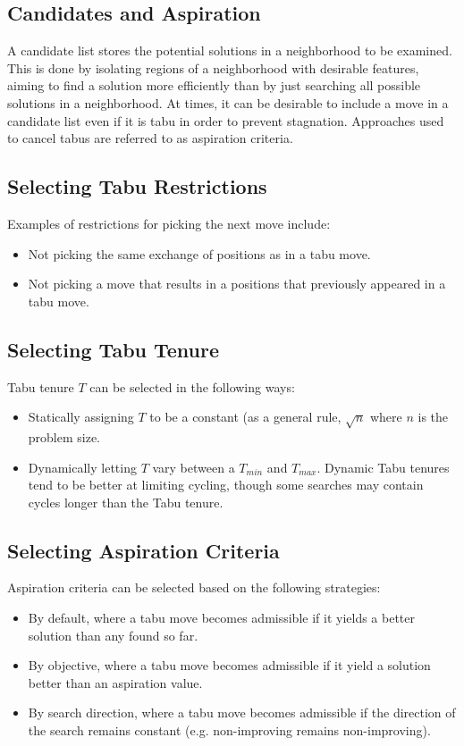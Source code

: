 \documentclass[12pt,titlepage]{article}
\begin{document}
    \subsection{Candidates and Aspiration}
      A candidate list stores the potential solutions in a neighborhood to be examined. This is done by isolating regions of a neighborhood with desirable features, aiming
      to find a solution more efficiently than by just searching all possible solutions in a neighborhood. At times, it can be desirable to include a move in a candidate list
      even if it is tabu in order to prevent stagnation. Approaches used to cancel tabus are referred to as aspiration criteria. 

    \subsection{Selecting Tabu Restrictions}
      Examples of restrictions for picking the next move include:
      \begin{itemize}
        \item Not picking the same exchange of positions as in a tabu move.
        \item Not picking a move that results in a positions that previously appeared in a tabu move.
      \end{itemize}

    \subsection{Selecting Tabu Tenure}
      Tabu tenure $T$ can be selected in the following ways:
      \begin{itemize}
        \item Statically assigning $T$ to be a constant (as a general rule, $\sqrt{n}$ where $n$ is the problem size.
        \item Dynamically letting $T$ vary between a $T_{min}$ and $T_{max}$. Dynamic Tabu tenures tend to be better at limiting cycling,
        though some searches may contain cycles longer than the Tabu tenure.
      \end{itemize}

    \subsection{Selecting Aspiration Criteria}
      Aspiration criteria can be selected based on the following strategies:
      \begin{itemize}
        \item By default, where a tabu move becomes admissible if it yields a better solution than any found so far.
        \item By objective, where a tabu move becomes admissible if it yield a solution better than an aspiration value.
        \item By search direction, where a tabu move becomes admissible if the direction of the search remains constant (e.g. non-improving remains non-improving).
      \end{itemize}
\end{document}
